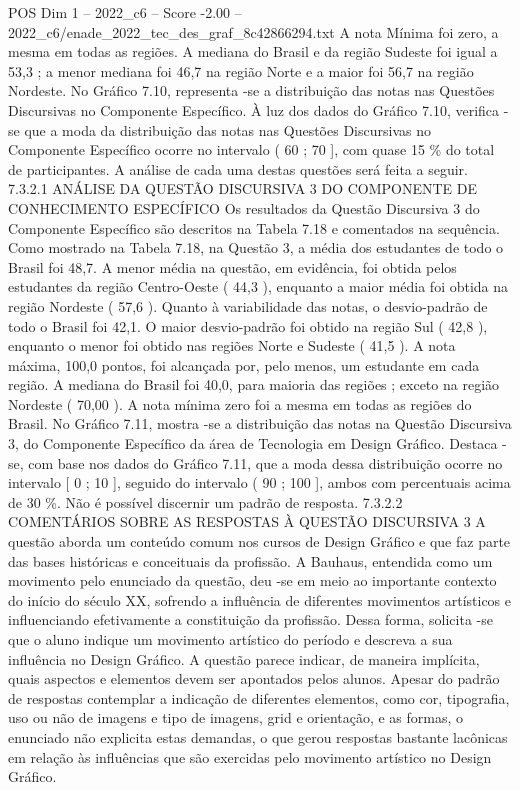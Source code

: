\begin{textsample}{POS Dim 1 – 2022\_c6 – Score -2.00 – 2022\_c6/enade\_2022\_tec\_des\_graf\_8c42866294.txt}
A nota Mínima foi zero, a mesma em todas as regiões.
A mediana do Brasil e da região Sudeste foi igual a 53,3 ; a menor mediana foi 46,7 na região Norte e a maior foi 56,7 na região Nordeste.
No Gráfico 7.10, representa -se a distribuição das notas nas Questões Discursivas no Componente Específico.
À luz dos dados do Gráfico 7.10, verifica -se que a moda da distribuição das notas nas Questões Discursivas no Componente Específico ocorre no intervalo ( 60 ; 70 ], com quase 15 \% do total de participantes.
A análise de cada uma destas questões será feita a seguir. 7.3.2.1 ANÁLISE DA QUESTÃO DISCURSIVA 3 DO COMPONENTE DE CONHECIMENTO ESPECÍFICO Os resultados da Questão Discursiva 3 do Componente Específico são descritos na Tabela 7.18 e comentados na sequência.
Como mostrado na Tabela 7.18, na Questão 3, a média dos estudantes de todo o Brasil foi 48,7.
A menor média na questão, em evidência, foi obtida pelos estudantes da região Centro-Oeste ( 44,3 ), enquanto a maior média foi obtida na região Nordeste ( 57,6 ).
Quanto à variabilidade das notas, o desvio-padrão de todo o Brasil foi 42,1.
O maior desvio-padrão foi obtido na região Sul ( 42,8 ), enquanto o menor foi obtido nas regiões Norte e Sudeste ( 41,5 ).
A nota máxima, 100,0 pontos, foi alcançada por, pelo menos, um estudante em cada região.
A mediana do Brasil foi 40,0, para maioria das regiões ; exceto na região Nordeste ( 70,00 ).
A nota mínima zero foi a mesma em todas as regiões do Brasil.
No Gráfico 7.11, mostra -se a distribuição das notas na Questão Discursiva 3, do Componente Específico da área de Tecnologia em Design Gráfico.
Destaca -se, com base nos dados do Gráfico 7.11, que a moda dessa distribuição ocorre no intervalo [ 0 ; 10 ], seguido do intervalo ( 90 ; 100 ], ambos com percentuais acima de 30 \%.
Não é possível discernir um padrão de resposta. 7.3.2.2 COMENTÁRIOS SOBRE AS RESPOSTAS À QUESTÃO DISCURSIVA 3 A questão aborda um conteúdo comum nos cursos de Design Gráfico e que faz parte das bases históricas e conceituais da profissão.
A Bauhaus, entendida como um movimento pelo enunciado da questão, deu -se em meio ao importante contexto do início do século XX, sofrendo a influência de diferentes movimentos artísticos e influenciando efetivamente a constituição da profissão.
Dessa forma, solicita -se que o aluno indique um movimento artístico do período e descreva a sua influência no Design Gráfico.
A questão parece indicar, de maneira implícita, quais aspectos e elementos devem ser apontados pelos alunos.
Apesar do padrão de respostas contemplar a indicação de diferentes elementos, como cor, tipografia, uso ou não de imagens e tipo de imagens, grid e orientação, e as formas, o enunciado não explicita estas demandas, o que gerou respostas bastante lacônicas em relação às influências que são exercidas pelo movimento artístico no Design Gráfico.

\end{textsample}
